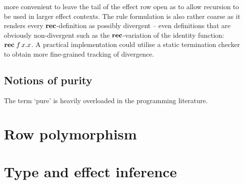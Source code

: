 \documentclass[12pt,phd,lfcs,twoside,openright,logo,leftchapter,normalheadings]{infthesis}
\theoremstyle{plain}
\theoremstyle{definition}
\begin{document}
more convenient to leave the tail of the effect row open as to allow
recursion to be used in larger effect contexts. The rule formulation
is also rather coarse as it renders every $\mathbf{rec}$-definition as
possibly divergent -- even definitions that are obviously
non-divergent such as the $\mathbf{rec}$-variation of the identity function:
$\mathbf{rec}\;f\,x.x$. A practical implementation could utilise a static
termination checker~\cite{Walther94} to obtain more fine-grained
tracking of divergence.

\subsection{Notions of purity}
\label{sec:notions-of-purity}
The term `pure' is heavily overloaded in the programming literature.
%

\section{Row polymorphism}
\label{sec:row-polymorphism}

\section{Type and effect inference}
\end{document}
